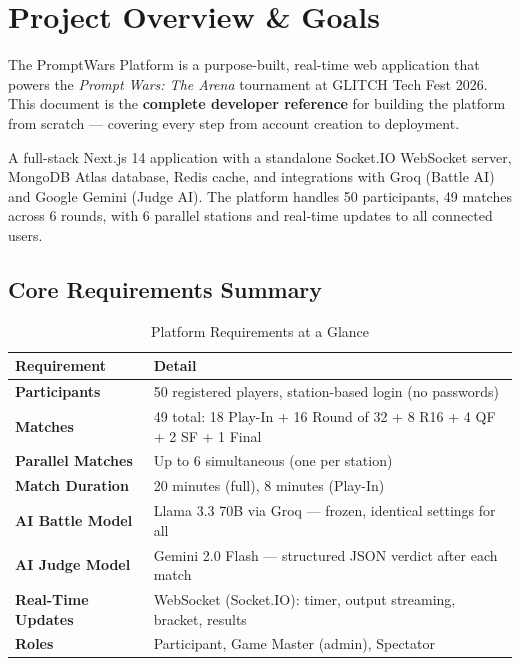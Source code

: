 \documentclass[11pt, a4paper]{article}
\begin{document}
{%
  \setlength{\parskip}{0pt}%
  \renewcommand{\baselinestretch}{0.9}%
  \small\tableofcontents
}
\newpage

\section{Project Overview \& Goals}

The PromptWars Platform is a purpose-built, real-time web application that powers the \textit{Prompt Wars: The Arena} tournament at GLITCH Tech Fest 2026. This document is the \textbf{complete developer reference} for building the platform from scratch --- covering every step from account creation to deployment.

\begin{tcolorbox}[keybox, title={What We Are Building}]
A full-stack Next.js 14 application with a standalone Socket.IO WebSocket server, MongoDB Atlas database, Redis cache, and integrations with Groq (Battle AI) and Google Gemini (Judge AI). The platform handles 50 participants, 49 matches across 6 rounds, with 6 parallel stations and real-time updates to all connected users.
\end{tcolorbox}

\subsection{Core Requirements Summary}

\begin{table}[H]
\centering
\small\renewcommand{\arraystretch}{1.3}
\begin{tabularx}{\textwidth}{>{\bfseries}p{3.5cm} X}
\toprule
Requirement & Detail \\
\midrule
Participants       & 50 registered players, station-based login (no passwords) \\
Matches            & 49 total: 18 Play-In + 16 Round of 32 + 8 R16 + 4 QF + 2 SF + 1 Final \\
Parallel Matches   & Up to 6 simultaneous (one per station) \\
Match Duration     & 20 minutes (full), 8 minutes (Play-In) \\
AI Battle Model    & Llama 3.3 70B via Groq --- frozen, identical settings for all \\
AI Judge Model     & Gemini 2.0 Flash --- structured JSON verdict after each match \\
Real-Time Updates  & WebSocket (Socket.IO): timer, output streaming, bracket, results \\
Roles              & Participant, Game Master (admin), Spectator \\
\bottomrule
\end{tabularx}
\caption{Platform Requirements at a Glance}
\end{table}
\end{document}
